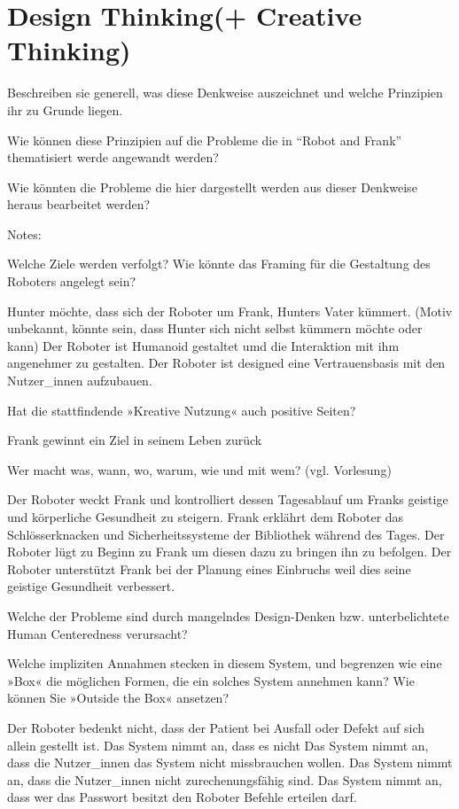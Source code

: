 \documentclass[sigchi-a, authorversion]{acmart}
\begin{document}
\section{Design Thinking(+ Creative Thinking)}

Beschreiben sie generell, was diese Denkweise auszeichnet und welche Prinzipien ihr zu Grunde liegen.

Wie können diese Prinzipien auf die Probleme die in ``Robot and Frank'' thematisiert werde angewandt werden?

Wie könnten die Probleme die hier dargestellt werden aus dieser Denkweise heraus bearbeitet werden?

Notes:

Welche Ziele werden verfolgt? Wie könnte das Framing für die Gestaltung des Roboters angelegt sein? 

Hunter möchte, dass sich der Roboter um Frank, Hunters Vater kümmert. (Motiv unbekannt, könnte sein, dass Hunter sich nicht selbst kümmern möchte oder kann)
Der Roboter ist Humanoid gestaltet umd die Interaktion mit ihm angenehmer zu gestalten.
Der Roboter ist designed eine Vertrauensbasis mit den Nutzer_innen aufzubauen.

Hat die stattfindende »Kreative Nutzung« auch positive Seiten?

Frank gewinnt ein Ziel in seinem Leben zurück

Wer macht was, wann, wo, warum, wie und mit wem? (vgl. Vorlesung)

Der Roboter weckt Frank und kontrolliert dessen Tagesablauf um Franks geistige und körperliche Gesundheit zu steigern.
Frank erklährt dem Roboter das Schlösserknacken und Sicherheitssysteme der Bibliothek während des Tages.
Der Roboter lügt zu Beginn zu Frank um diesen dazu zu bringen ihn zu befolgen.
Der Roboter unterstützt Frank bei der Planung eines Einbruchs weil dies seine geistige Gesundheit verbessert.

Welche der Probleme sind durch mangelndes Design-Denken bzw. unterbelichtete Human Centeredness
verursacht?

Welche impliziten Annahmen stecken in diesem System, und begrenzen wie eine »Box« die möglichen
Formen, die ein solches System annehmen kann? Wie können Sie »Outside the Box« ansetzen?

Der Roboter bedenkt nicht, dass der Patient bei Ausfall oder Defekt auf sich allein gestellt ist.
Das System nimmt an, dass es nicht
Das System nimmt an, dass die Nutzer_innen das System nicht missbrauchen wollen.
Das System nimmt an, dass die Nutzer_innen nicht zurechenungsfähig sind.
Das System nimmt an, dass wer das Passwort besitzt den Roboter Befehle erteilen darf.
\end{document}
